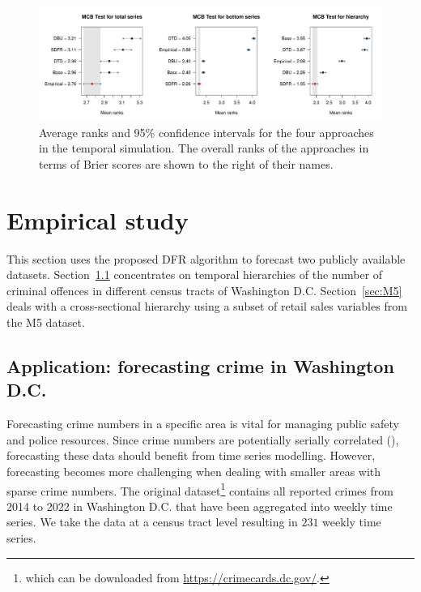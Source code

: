 \documentclass[a4paper,review,11pt,authoryear]{elsarticle}
\theoremstyle{definition}
\begin{document}
     \begin{figure}
       \caption{\label{fig:sim_temporal_mcb_prob}Average ranks and 95\% confidence intervals for the four approaches in the temporal simulation. The overall ranks of the approaches in terms of Brier scores are shown to the right of their names.}
       \includegraphics[width=\textwidth]{figures/temporal_mcb.pdf}
     \end{figure}

     \section{Empirical study}
     \label{sec:application}
     This section uses the proposed DFR algorithm to forecast two publicly available datasets.
     Section~\ref{sec:application_crime} concentrates on temporal hierarchies of the number of criminal offences in different census tracts of Washington D.C.
     Section~\ref{sec:M5} deals with a cross-sectional hierarchy using a subset of retail sales variables from the M5 dataset.

     \subsection{Application: forecasting crime in Washington D.C.}
     \label{sec:application_crime}

     Forecasting crime numbers in a specific area is vital for managing public safety and police resources. Since crime numbers are potentially serially correlated (\citealp{aldor-noimanSpatioTemporalLowCount2013}), forecasting these data should benefit from time series modelling.
     However, forecasting becomes more challenging when dealing with smaller areas with sparse crime numbers.
     The original dataset\footnote{which can be downloaded from \url{https://crimecards.dc.gov/}.} contains all reported crimes from 2014 to 2022 in Washington D.C. that have been aggregated into weekly time series. We take the data at a census tract level resulting in $231$ weekly time series. 
\end{document}
